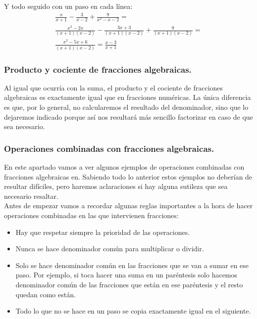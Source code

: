 \documentclass[a4paper,11pt,answers]{exam}
\begin{document}
\begin{questions}
\begin{solution}
    Y todo seguido con un paso en cada línea:
    \begin{gather*}
      \frac{x}{x+1} - \frac{3}{x-2} + \frac{9}{x^2 - x - 2} =\\
      \frac{x^2 - 2x}{(x+1)(x-2)} - \frac{3x+3}{(x+1)(x-2)} + \frac{9}{(x+1)(x-2)} = \\
      \frac{x^2 - 5x + 6}{(x+1)(x-2)} =
      \frac{x-3}{x+1}
    \end{gather*}
  \end{solution}
\end{questions}

\subsubsection{Producto y cociente de fracciones algebraicas.}
Al igual que ocurría con la suma, el producto y el cociente de fracciones algebraicas es
exactamente igual que en fracciones numéricas. La única diferencia es que, por lo general, no calcularemos el resultado del denominador, sino que lo dejaremos indicado porque así nos resultará más sencillo factorizar en caso de que sea necesario.

\subsubsection{Operaciones combinadas con fracciones algebraicas.}
En este apartado vamos a ver algunos ejemplos de operaciones combinadas con fracciones algebraicas en. Sabiendo todo lo anterior estos ejemplos no deberían de resultar difíciles, pero haremos aclaraciones si hay alguna sutileza que sea necesario resaltar.\\

Antes de empezar vamos a recordar algunas reglas importantes a la hora de hacer operaciones combinadas en las que intervienen fracciones:
\begin{itemize}
\item Hay que respetar siempre la prioridad de las operaciones.
\item Nunca se hace denominador común para multiplicar o dividir.
\item Solo se hace denominador común en las fracciones que se van a sumar en ese paso. Por ejemplo, si toca hacer una suma en un paréntesis solo hacemos denominador común de las fracciones que están en ese paréntesis y el resto quedan como están.
\item Todo lo que no se hace en un paso se copia exactamente igual en el siguiente.
\end{itemize}
\end{document}
